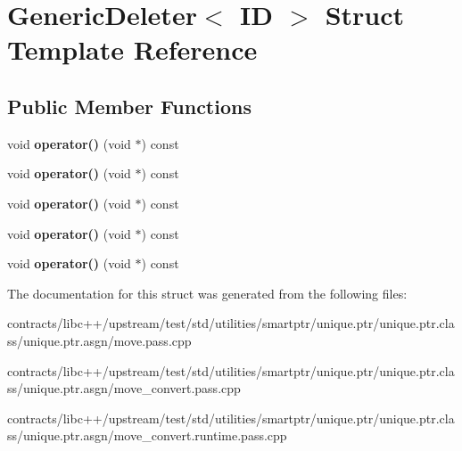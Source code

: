 \hypertarget{struct_generic_deleter}{}\section{Generic\+Deleter$<$ ID $>$ Struct Template Reference}
\label{struct_generic_deleter}
\subsection*{Public Member Functions}
\begin{DoxyCompactItemize}
\item 
\mbox{\label{struct_generic_deleter_a6ec67642a0f92fa3874f27a964fbff2e}} 
void {\bfseries operator()} (void $\ast$) const
\item 
\mbox{\label{struct_generic_deleter_a6ec67642a0f92fa3874f27a964fbff2e}} 
void {\bfseries operator()} (void $\ast$) const
\item 
\mbox{\label{struct_generic_deleter_a6ec67642a0f92fa3874f27a964fbff2e}} 
void {\bfseries operator()} (void $\ast$) const
\item 
\mbox{\label{struct_generic_deleter_a6ec67642a0f92fa3874f27a964fbff2e}} 
void {\bfseries operator()} (void $\ast$) const
\item 
\mbox{\label{struct_generic_deleter_a6ec67642a0f92fa3874f27a964fbff2e}} 
void {\bfseries operator()} (void $\ast$) const
\end{DoxyCompactItemize}


The documentation for this struct was generated from the following files\+:\begin{DoxyCompactItemize}
\item 
contracts/libc++/upstream/test/std/utilities/smartptr/unique.\+ptr/unique.\+ptr.\+class/unique.\+ptr.\+asgn/move.\+pass.\+cpp\item 
contracts/libc++/upstream/test/std/utilities/smartptr/unique.\+ptr/unique.\+ptr.\+class/unique.\+ptr.\+asgn/move\+\_\+convert.\+pass.\+cpp\item 
contracts/libc++/upstream/test/std/utilities/smartptr/unique.\+ptr/unique.\+ptr.\+class/unique.\+ptr.\+asgn/move\+\_\+convert.\+runtime.\+pass.\+cpp\end{DoxyCompactItemize}
